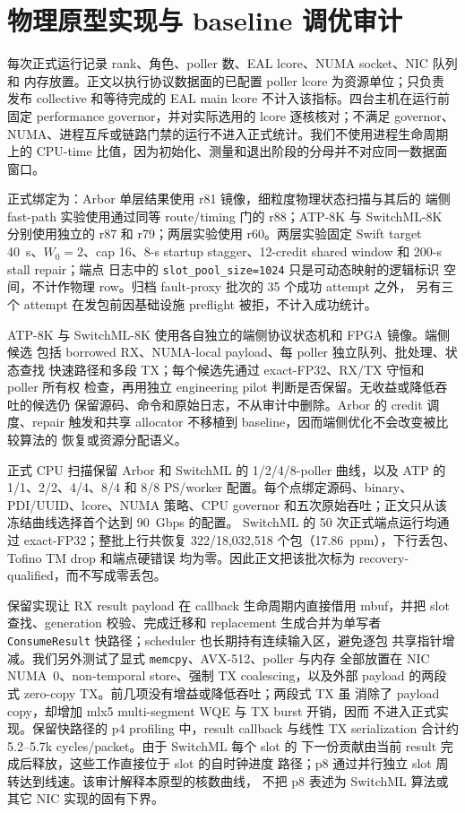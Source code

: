 \appendix

\chapter{物理原型实现与 baseline 调优审计}
\label{app:physical-implementation-audit}

每次正式运行记录 rank、角色、poller 数、EAL lcore、NUMA socket、NIC 队列和
内存放置。正文以执行协议数据面的已配置 poller lcore 为资源单位；只负责
发布 collective 和等待完成的 EAL main lcore 不计入该指标。四台主机在运行前
固定 performance governor，并对实际选用的 lcore 逐核核对；不满足 governor、
NUMA、进程互斥或链路门禁的运行不进入正式统计。我们不使用进程生命周期上的
CPU-time 比值，因为初始化、测量和退出阶段的分母并不对应同一数据面窗口。

正式绑定为：Arbor 单层结果使用 r81 镜像，细粒度物理状态扫描与其后的
端侧 fast-path 实验使用通过同等 route/timing 门的 r88；ATP-8K 与
SwitchML-8K 分别使用独立的 r87 和 r79；两层实验使用 r60。两层实验固定
Swift target 40~\textmu s、$W_0=2$、cap 16、8-\textmu s startup
stagger、12-credit shared window 和 200-\textmu s stall repair；端点
日志中的 \texttt{slot\_pool\_size=1024} 只是可动态映射的逻辑标识
空间，不计作物理 row。归档 fault-proxy 批次的 35 个成功 attempt 之外，
另有三个 attempt 在发包前因基础设施 preflight 被拒，不计入成功统计。

ATP-8K 与 SwitchML-8K 使用各自独立的端侧协议状态机和 FPGA 镜像。端侧候选
包括 borrowed RX、NUMA-local payload、每 poller 独立队列、批处理、状态查找
快速路径和多段 TX；每个候选先通过 exact-FP32、RX/TX 守恒和 poller 所有权
检查，再用独立 engineering pilot 判断是否保留。无收益或降低吞吐的候选仍
保留源码、命令和原始日志，不从审计中删除。Arbor 的 credit 调度、repair
触发和共享 allocator 不移植到 baseline，因而端侧优化不会改变被比较算法的
恢复或资源分配语义。

正式 CPU 扫描保留 Arbor 和 SwitchML 的 1/2/4/8-poller 曲线，以及 ATP
的 1/1、2/2、4/4、8/4 和 8/8 PS/worker 配置。每个点绑定源码、binary、
PDI/UUID、lcore、NUMA 策略、CPU governor 和五次原始吞吐；正文只从该
冻结曲线选择首个达到 90~Gbps 的配置。
SwitchML 的 50 次正式端点运行均通过 exact-FP32；整批上行共恢复
322/18,032,518 个包（17.86~ppm），下行丢包、Tofino TM drop 和端点硬错误
均为零。因此正文把该批次标为 recovery-qualified，而不写成零丢包。

保留实现让 RX result payload 在 callback 生命周期内直接借用 mbuf，并把
slot 查找、generation 校验、完成迁移和 replacement 生成合并为单写者
\texttt{ConsumeResult} 快路径；scheduler 也长期持有连续输入区，避免逐包
共享指针增减。我们另外测试了显式 \texttt{memcpy}、AVX-512、poller 与内存
全部放置在 NIC NUMA~0、non-temporal store、强制 TX coalescing，以及外部
payload 的两段式 zero-copy TX。前几项没有增益或降低吞吐；两段式 TX 虽
消除了 payload copy，却增加 mlx5 multi-segment WQE 与 TX burst 开销，因而
不进入正式实现。保留快路径的 p4 profiling 中，result callback 与线性 TX
serialization 合计约 5.2--5.7k cycles/packet。由于 SwitchML 每个 slot 的
下一份贡献由当前 result 完成后释放，这些工作直接位于 slot 的自时钟进度
路径；p8 通过并行独立 slot 周转达到线速。该审计解释本原型的核数曲线，
不把 p8 表述为 SwitchML 算法或其它 NIC 实现的固有下界。

